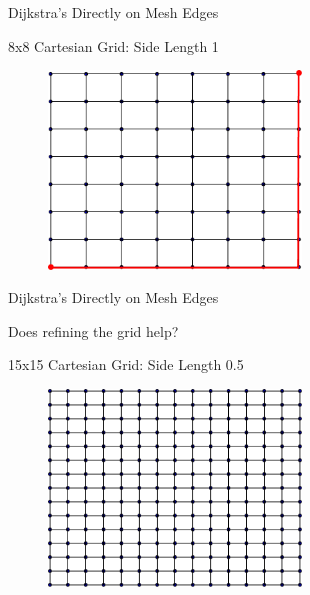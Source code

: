 \documentclass{beamer}
\begin{document}
\begin{frame}{Dijkstra's Directly on Mesh Edges}

8x8 Cartesian Grid: Side Length 1

\begin{figure}[t]
    \includegraphics[width=0.6\textwidth]{8x8CartesianPath1.pdf}
\end{figure}


\end{frame}

\begin{frame}{Dijkstra's Directly on Mesh Edges}

Does refining the grid help?

15x15 Cartesian Grid: Side Length 0.5

\begin{figure}[t]
    \includegraphics[width=0.6\textwidth]{15x15Cartesian.pdf}
\end{figure}


\end{frame}
\end{document}
